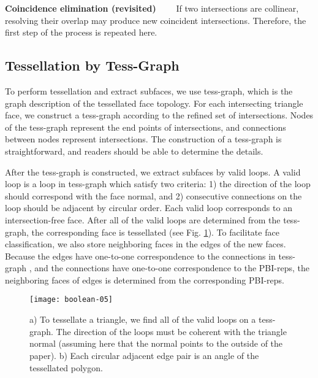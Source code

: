 \vspace{0.5em}
\noindent \textbf{Coincidence elimination (revisited)}~~~~
If two intersections are collinear, resolving their overlap may produce new coincident intersections. Therefore, the first step of the process is repeated here.

\subsection{Tessellation by Tess-Graph}
\label{sec:tess}

To perform tessellation and extract subfaces, we use tess-graph, which is the graph description of the tessellated face topology. For each intersecting triangle face, we construct a tess-graph according to the refined set of intersections. Nodes of the tess-graph represent the end points of intersections, and connections between nodes represent intersections. The construction of a tess-graph is straightforward, and readers should be able to determine the details.


After the tess-graph is constructed, we extract subfaces by   valid loops. A valid loop is a loop in tess-graph which satisfy two criteria: 1) the direction of the loop should correspond with the face normal, and 2) consecutive connections on the loop should be adjacent by circular order. Each valid loop corresponds to an intersection-free face. After all of the valid loops are determined from the tess-graph, the corresponding face is tessellated (see Fig. \ref{fig:cadj}). To facilitate face classification, we also store neighboring faces in the edges of the new faces. Because the edges have one-to-one correspondence to the connections in tess-graph , and the connections have one-to-one correspondence to the PBI-reps, the neighboring faces of edges is determined from the corresponding PBI-reps.

\begin{figure}[t]
\centering
\texttt{[image: boolean-05]}
\caption{a) To tessellate a triangle, we find all of the valid loops on a tess-graph. The direction of the loops must be coherent with the triangle normal (assuming here that the normal points to the outside of the paper). b) Each circular adjacent edge pair is an angle of the tessellated polygon.}
\label{fig:cadj}
\end{figure}
